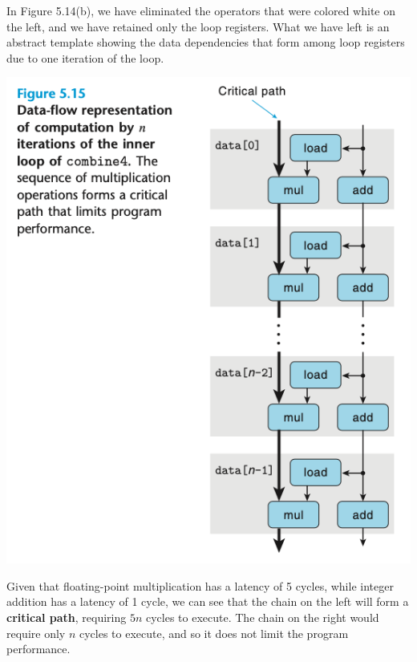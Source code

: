 \documentclass[11pt]{article}
\begin{document}
\begin{enumerate}
In Figure 5.14(b), we have eliminated the operators that were colored white on the left, and we have retained only the loop registers. What we have left is an abstract template showing the data dependencies that form among loop registers due to one iteration of the loop.\\

\begin{center}
\includegraphics[width=.9\linewidth]{pics/figure5.15-data-flow-representation-of-computation-by-n-iterations-of-the-inner-loop-of-combine4.png}
\end{center}

Given that floating-point multiplication has a latency of 5 cycles, while integer addition has a latency of 1 cycle, we can see that the chain on the left will form a \textbf{critical path}, requiring \(5n\) cycles to execute. The chain on the right would require only \(n\) cycles to execute, and so it does not limit the program performance.\\


\end{enumerate}
\end{document}
